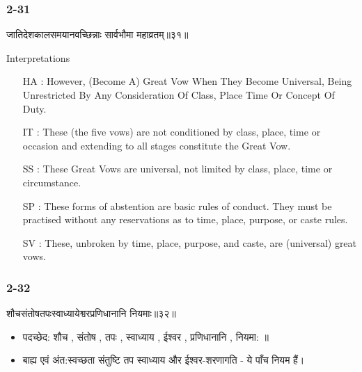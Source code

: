 \begin{frame}[fragile]\frametitle{2-31}
\begin{sanskrit}
जातिदेशकालसमयानवच्छिन्नाः सार्वभौमा महाव्रतम्॥३१॥
\end{sanskrit}

Interpretations
\begin{itemize}
\item [HA]: However, (Become A) Great Vow When They Become Universal, Being Unrestricted By Any Consideration Of Class, Place Time Or Concept Of Duty.
\item [IT]: These (the five vows) are not conditioned by class, place, time or occasion and extending to all stages constitute the Great Vow.
\item [SS]: These Great Vows are universal, not limited by class, place, time or circumstance.
\item [SP]: These forms of abstention are basic rules of conduct. They must be practised without any reservations as to time, place, purpose, or caste rules.
\item [SV]: These, unbroken by time, place, purpose, and caste, are (universal) great vows. 
\end{itemize}
		
\end{frame}

\begin{frame}[fragile]\frametitle{2-32}
\begin{sanskrit}
शौचसंतोषतपःस्वाध्यायेश्वरप्रणिधानानि नियमाः॥३२॥
\end{sanskrit}

\begin{itemize}
\item पदच्छेद: शौच , संतोष , तपः , स्वाध्याय , ईश्वर , प्रणिधानानि , नियमा: ॥
\item बाह्य एवं अंत:स्वच्छता संतुष्टि तप स्वाध्याय और ईश्वर-शरणागति - ये पाँच नियम हैं।
\end{itemize}	
	
\end{frame}


